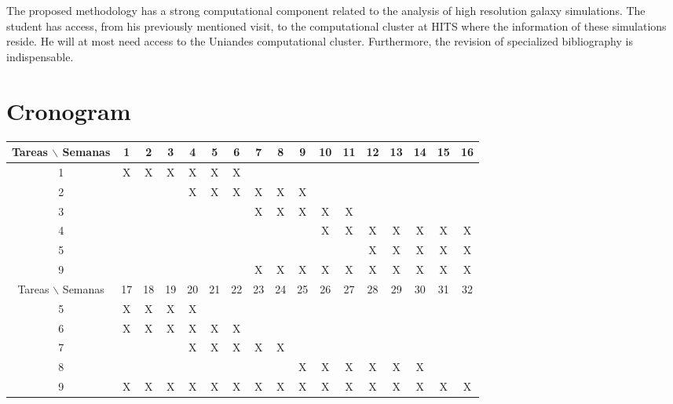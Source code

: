 \documentclass[12pt]{article}
\begin{document}
The proposed methodology has a strong computational component related to the analysis of high resolution galaxy simulations. The student has access, from his previously mentioned visit, to the computational cluster at HITS where the information of these simulations reside. He will at most need access to the Uniandes computational cluster. Furthermore, the revision of specialized bibliography is indispensable.\\


\section{Cronogram}

\begin{table}[htb]
	\begin{tabular}{|c|cccccccccccccccc| }
	\hline
	Tareas $\backslash$ Semanas & 1 & 2 & 3 & 4 & 5 & 6 & 7 & 8 & 9 & 10 & 11 & 12 & 13 & 14 & 15 & 16  \\
	\hline
	1 & X & X & X & X & X & X &   &   &   &   &   &   &   &   &   &   \\
	2 &   &   &   & X & X & X & X & X & X &   &   &   &   &   &   &   \\
	3 &   &   &   &   &   &   & X & X & X & X & X &   &   &   &   &   \\
	4 &   &   &   &   &   &   &   &   &   & X & X & X & X & X & X & X \\
	5 &   &   &   &   &   &   &   &   &   &   &   & X & X & X & X & X \\
	9 &   &   &   &   &   &   & X & X & X & X & X & X & X & X & X & X \\

	\hline
	Tareas $\backslash$ Semanas & 17 & 18 & 19 & 20 & 21 & 22 & 23 & 24 & 25 & 26 & 27 & 28 & 29 & 30 & 31 & 32  \\
	\hline
	5 & X & X & X & X &   &   &   &   &   &   &   &   &   &   &   &   \\
	6 & X & X & X & X & X & X &   &   &   &   &   &   &   &   &   &   \\
	7 &   &   &   & X & X & X & X & X &   &   &   &   &   &   &   &   \\
	8 &   &   &   &   &   &   &   &   & X & X & X & X & X & X &   &   \\
	9 & X & X & X & X & X & X & X & X & X & X & X & X & X & X & X & X \\


	\hline
	\end{tabular}
\end{table}
\vspace{1mm}
\end{document}
